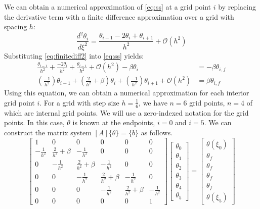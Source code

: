 \documentclass[10pt,letterpaper,notitlepage]{article}
\begin{document}
    We can obtain a numerical approximation of \cref{eq:ss} at a grid point $i$ by replacing the derivative term with a finite difference approximation over a grid with spacing $h$:
    \begin{equation}
        \frac{d^2 \theta_i}{d\xi^2} = \frac{ \theta_{i-1} - 2 \theta_i + \theta_{i+1} }{h^2} + \mathcal{O}(h^2)
        \label{eq:finitediff2}
    \end{equation} 
    Substituting \cref{eq:finitediff2} into \cref{eq:ss} yields:
    \begin{align}
        \frac{\theta_{i-1}}{h^2} + \frac{-2 \theta_i}{h^2} + 
        \frac{\theta_{i-1}}{h^2} + \mathcal{O}(h^2) - \beta{\theta_i} 
        &= -\beta \theta_{i,f}\\
        \left(\frac{-1}{h^2}\right) \theta_{i-1} + 
        \left(\frac{2}{h^2} + \beta \right) \theta_{i} + 
        \left(\frac{-1}{h^2}\right) \theta_{i+1} +
        \mathcal{O}(h^2)
        &= \beta \theta_{i,f}
        \label{eq:Amatrixeqn}
    \end{align}
    Using this equation, we can obtain a numerical approximation for each interior grid point $i$. For a grid with step size $h=\frac{1}{6}$, we have $n=6$ grid points, $n=4$ of which are internal grid points. We will use a zero-indexed notation for the grid points. In this case, $\theta$ is known at the endpoints, $i=0$ and $i=5$. We can construct the matrix system $[A] \{\theta\} = \{b\}$ as follows.
    \begin{equation}
        \begin{bmatrix}
            1 & 0 & 0 & 0 & 0 & 0 \\
            -\frac{1}{h^2} & \frac{2}{h^2} + \beta & -\frac{1}{h^2} & 0 & 0 & 0 \\
            0 & -\frac{1}{h^2} & \frac{2}{h^2} + \beta & -\frac{1}{h^2} & 0 & 0 \\
            0 & 0 & -\frac{1}{h^2}& \frac{2}{h^2} + \beta & -\frac{1}{h^2} & 0 \\
            0 & 0 & 0 & -\frac{1}{h^2} & \frac{2}{h^2} + \beta & -\frac{1}{h^2} \\
            0 & 0 & 0 & 0 & 0 & 1 
        \end{bmatrix}
        \begin{bmatrix}
            \theta_0 \\
            \theta_1 \\
            \theta_2 \\
            \theta_3 \\
            \theta_4 \\
            \theta_5
        \end{bmatrix}
        =
        \begin{bmatrix}
            \theta(\xi_0) \\
            \theta_f \\
            \theta_f \\
            \theta_f \\
            \theta_f \\
            \theta(\xi_5)  
        \end{bmatrix}
        \label{eq:ss_Axb}
    \end{equation}
\end{document}
